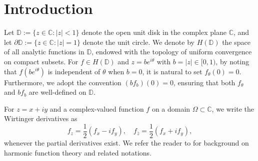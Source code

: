 \documentclass[12pt, reqno]{amsart}
\begin{document}
\begin{abstract}
We study conjugate-type phenomena for complex-valued harmonic quasiregular mappings in the unit disk across three function space families: $Q(n,p,\alpha)$, $F(p,q,s)$, and the non-derivative $M(p,q,s)$. For a harmonic $K$-quasiregular mapping $f=u+iv$, we first show that if the real part $u$ belongs to $Q_h(1,p,\alpha)$ (with $\alpha>-1$ and $\alpha+1<p<\alpha+2$), the imaginary part $v$ lies in the same space with a $K$-dependent quantitative bound. An analogous stability result is established for the harmonic $F$-scale, with sharp $K$-dependence. These results are extended to harmonic $(K, K')$-quasiregular mappings, yielding explicit estimates with an additional inhomogeneous term involving $K'$. Finally, for normalized harmonic quasiconformal mappings, %
we derive membership criteria in the harmonic $M$- and $F$-scales, and obtain corresponding conclusions for their natural derivatives, with parameter ranges governed by the order $\alpha_K$ of the family of harmonic quasiconformal mappings.
\end{abstract}

\maketitle
\pagestyle{myheadings}

\tableofcontents	

\section{Introduction}
Let $\mathbb{D}:=\{z \in \mathbb{C}: |z| < 1\}$ denote the open unit disk in the complex plane $\mathbb{C}$, and let  
$\partial\mathbb{D}:=\{z\in\mathbb{C}: |z| = 1\}$ denote the unit circle. We denote by $H(\mathbb{D})$ the space of all analytic functions in $\mathbb{D}$, endowed with the topology of uniform convergence on compact subsets. For $f\in H(\mathbb{D})$ and $z=b e^{i\theta}$ with $b=|z|\in[0,1)$, by noting that $f(be^{i\theta})$ is independent of $\theta$ when $b=0$, it is natural to set
$f_\theta(0)=0$.
Furthermore, we adopt the convention $(bf_b)(0)=0$, ensuring that both $f_\theta$ and $bf_b$
are well-defined on $\mathbb D$.

For $z=x+iy$ and a complex-valued function $f$ on a domain $\Omega\subset\mathbb C$,
we write the Wirtinger derivatives as
\[
f_z=\frac12\left(f_x-i f_y\right),\quad
f_{\bar z}=\frac12\left(f_x+i f_y\right),
\]
whenever the partial derivatives exist. We refer the reader to \cite[Chapters~1-2]{ABR} for background on harmonic function theory and related notations.
\end{document}
